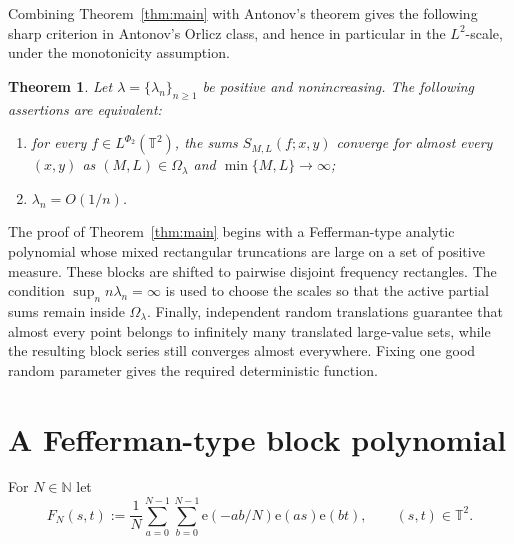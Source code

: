 \documentclass[11pt]{amsart}
\numberwithin{equation}{section}
\newtheorem{theorem}{Theorem}[section]
\begin{document}
Combining Theorem~\ref{thm:main} with Antonov's theorem gives the following
sharp criterion in Antonov's Orlicz class, and hence in particular in the
$L^2$-scale, under the monotonicity assumption.

\begin{theorem}
\label{thm:characterization} Let $\lambda=\{\lambda_n\}_{n\ge1}$ be positive
and nonincreasing. The following assertions are equivalent:

\begin{enumerate}
\item for every $f\in L^{\Phi _{2}}(\mathbb{T}^{2})$, the sums $%
S_{M,L}(f;x,y)$ converge for almost every $(x,y)$ as $(M,L)\in \Omega
_{\lambda }$ and $\min \{M,L\}\rightarrow \infty $;

\item $\lambda _{n}=O(1/n)$.
\end{enumerate}
\end{theorem}

The proof of Theorem~\ref{thm:main} begins with a Fefferman-type analytic
polynomial whose mixed rectangular truncations are large on a set of
positive measure. These blocks are shifted to pairwise disjoint frequency
rectangles. The condition $\sup_n n\lambda_n=\infty$ is used to choose the
scales so that the active partial sums remain inside $\Omega_\lambda$.
Finally, independent random translations guarantee that almost every point
belongs to infinitely many translated large-value sets, while the resulting
block series still converges almost everywhere. Fixing one good random parameter gives
the required deterministic function.

\section{A Fefferman-type block polynomial}

For $N\in\mathbb{N}$ let 
\begin{equation}  \label{eq:FN}
F_N(s,t):=\frac1N\sum_{a=0}^{N-1}\sum_{b=0}^{N-1} \mathrm{e}%
\!\left(-ab/N\right)\mathrm{e}\!\left(as\right)\mathrm{e}\!\left(bt\right),
\qquad (s,t)\in\mathbb{T}^2.
\end{equation}
\end{document}
